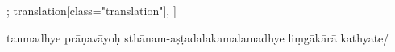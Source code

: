 \documentclass[12pt]{article}%
\def\om{\textrm{\footnotesize \textit{omitted in}\ }} %
\begin{document}
\begin{alignment}[
    texts=edition[class="edition"];
    translation[class="translation"],
  ]
\begin{edition}
\begin{prose}
tanmadhye prāṇavāyoḥ sthānam-aṣṭadalakamalamadhye liṃgākārā  kathyate/   

\end{prose}
\end{edition}
\end{alignment}
\end{document}
